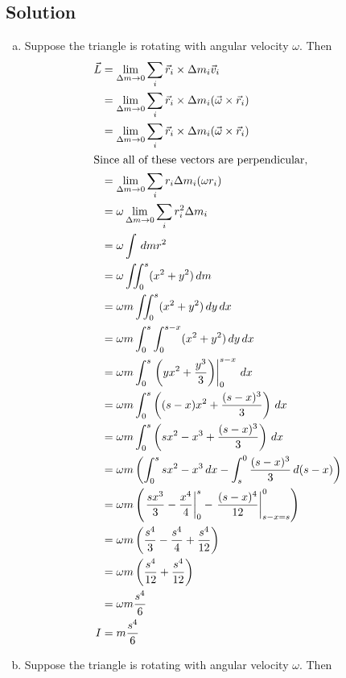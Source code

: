 \documentclass[solutions]{esg8012pset}
\renewcommand{\d}{\,d}
\begin{document}
\subsection*{Solution}
  \begin{enumerate}[(a)]
    \item Suppose the triangle is rotating with angular velocity $\omega$.  Then \begin{align*}
      \vec L & = \lim_{\Delta m\to 0} \sum_{i} \vec r_i \times \Delta m_i \vec v_i \\
      & = \lim_{\Delta m\to 0} \sum_{i} \vec r_i \times \Delta m_i (\vec \omega \times \vec r_i) \\
      & = \lim_{\Delta m\to 0} \sum_{i} \vec r_i \times \Delta m_i (\vec \omega \times \vec r_i) \\
    \intertext{Since all of these vectors are perpendicular,}
      & = \lim_{\Delta m\to 0} \sum_{i} r_i \Delta m_i (\omega r_i) \\
      & = \omega \lim_{\Delta m\to 0} \sum_{i} r_i^2 \Delta m_i \\
      & = \omega \int \d m r^2 \\
      & = \omega \iint_0^s (x^2 + y^2)\d m \\
      & = \omega m \iint_0^s (x^2 + y^2)\d y\d x \\
      & = \omega m \int_0^s \int_0^{s-x} (x^2 + y^2)\d y\d x \\
      & = \omega m \int_0^s \left.\left(y x^2 + \frac{y^3}{3}\right)\right|_0^{s-x} \d x \\
      & = \omega m \int_0^s \left((s-x)x^2 + \frac{(s-x)^3}{3}\right) \d x \\
      & = \omega m \int_0^s \left(sx^2 - x^3 + \frac{(s-x)^3}{3}\right) \d x \\
      & = \omega m \left( \int_0^s sx^2 - x^3 \d x - \int_s^0 \frac{(s-x)^3}{3} \d (s-x) \right) \\
      & = \omega m \left( \left.\frac{sx^3}{3} - \frac{x^4}{4}\right|_0^s - \left.\frac{(s-x)^4}{12}\right|_{s-x=s}^0 \right) \\
      & = \omega m \left( \frac{s^4}{3} - \frac{s^4}{4} + \frac{s^4}{12}\right) \\
      & = \omega m \left( \frac{s^4}{12} + \frac{s^4}{12}\right) \\
      & = \omega m \frac{s^4}{6} \\
    I & = m \frac{s^4}{6}
    \end{align*}
    \item Suppose the triangle is rotating with angular velocity $\omega$.  Then \begin{align*}

\end{align*}
\end{enumerate}
\end{document}
